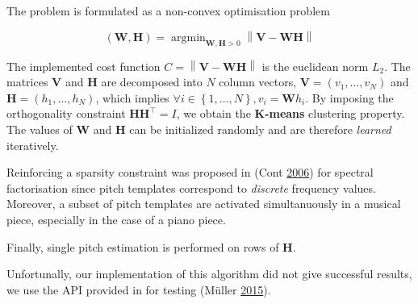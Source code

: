 \documentclass[american,]{article}
\begin{document}
The problem is formulated as a non-convex optimisation problem

\[(\boldsymbol{W},\boldsymbol{H}) = \mathop{\mathrm{argmin}}_{\boldsymbol{W},\boldsymbol{H}>0} \left\lVert\boldsymbol{V}-\boldsymbol{W}\boldsymbol{H}\right\rVert\]

The implemented cost function \(C=\left\lVert\boldsymbol{V}-\boldsymbol{W}\boldsymbol{H}\right\rVert\) is the euclidean norm \(L_2\).
The matrices \(\boldsymbol{V}\) and \(\boldsymbol{H}\) are decomposed into \(N\) column vectors,
\(\boldsymbol{V}=(v_1,\ldots,v_N)\) and \(\boldsymbol{H}=(h_1,\ldots,h_N)\), which implies
\(\forall i\in\left\{1,\ldots,N\right\},v_i = \boldsymbol{W}h_i\).
By imposing the orthogonality constraint \(\boldsymbol{H}{\boldsymbol{H}}^{\top}=I\),
we obtain the \textbf{K-means} clustering property.
The values of \(\boldsymbol{W}\) and \(\boldsymbol{H}\) can be initialized randomly
and are therefore \emph{learned} iteratively.

Reinforcing a sparsity constraint was proposed in (Cont \protect\hyperlink{ref-cont_2006}{2006})
for spectral factorisation since pitch templates correspond to \emph{discrete}
frequency values.
Moreover, a subset of pitch templates are activated simultanuously
in a musical piece, especially in the case of a piano piece.

Finally, single pitch estimation is performed on rows of \(\boldsymbol{H}\).

Unfortunally, our implementation of this algorithm
did not give successful results, we use
the API provided in for testing (Müller \protect\hyperlink{ref-muller_2015}{2015}).
\end{document}
